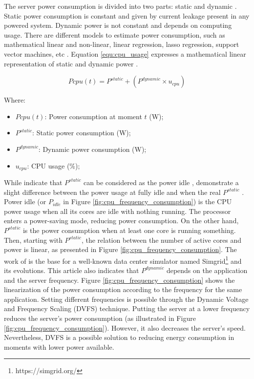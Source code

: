 The server power consumption is divided into two parts: static and dynamic \cite{orgerie2014survey, heinrich2017predicting}. Static power consumption is constant and given by current leakage present in any powered system. Dynamic power is not constant and depends on computing usage. There are different models to estimate power consumption, such as mathematical linear and non-linear, linear regression, lasso regression, support vector machines, etc \cite{ismail2020computing}. Equation \ref{equ:cpu_usage} expresses a mathematical linear representation of static and dynamic power \cite{heinrich2017predicting, ismail2020computing}.

\begin{equation}
    \label{equ:cpu_usage}
    Pcpu(t) = P^{static} + (P^{dynamic} \times u_{cpu})
\end{equation}

Where:
\begin{itemize}
    \item $Pcpu(t)$: Power consumption at moment $t$ (W);
    \item $P^{static}$: Static power consumption (W);
    \item $P^{dynamic}$: Dynamic power consumption (W);
    \item $u_{cpu}$: CPU usage (\%);
\end{itemize}


While \citeauthor{ismail2020computing} indicate that $P^{static}$ can be considered as the power idle \cite{ismail2020computing}, \citeauthor{heinrich2017predicting} demonstrate a slight difference between the power usage at fully idle and when the real $P^{static}$ \cite{heinrich2017predicting}. Power idle (or $P_{idle}$ in Figure \ref{fig:cpu_frequency_consumption}) is the CPU power usage when all its cores are idle with nothing running. The processor enters a power-saving mode, reducing power consumption. On the other hand, $P^{static}$ is the power consumption when at least one core is running something. Then, starting with $P^{static}$, the relation between the number of active cores and power is linear, as presented in Figure \ref{fig:cpu_frequency_consumption}. The work of \citeauthor{heinrich2017predicting} is the base for a well-known data center simulator named Simgrid\footnote{https://simgrid.org/} and its evolutions. This article also indicates that $P^{dynamic}$ depends on the application and the server frequency. Figure \ref{fig:cpu_frequency_consumption} shows the linearization of the power consumption according to the frequency for the same application. Setting different frequencies is possible through the Dynamic Voltage and Frequency Scaling (DVFS) technique. Putting the server at a lower frequency reduces the server's power consumption (as illustrated in Figure \ref{fig:cpu_frequency_consumption}). However, it also decreases the server's speed. Nevertheless, DVFS is a possible solution to reducing energy consumption in moments with lower power available. 


